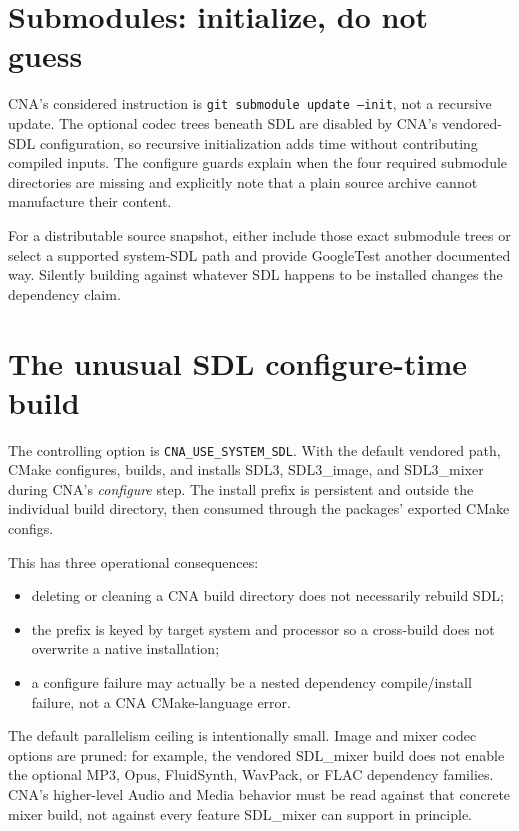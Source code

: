 \section{Submodules: initialize, do not guess}

CNA's considered instruction is \texttt{git submodule update --init}, not a recursive update.
The optional codec trees beneath SDL are disabled by CNA's vendored-SDL configuration, so recursive
initialization adds time without contributing compiled inputs.  The configure guards explain when
the four required submodule directories are missing and explicitly note that a plain source archive
cannot manufacture their content.

For a distributable source snapshot, either include those exact submodule trees or select a
supported system-SDL path and provide GoogleTest another documented way.  Silently building against
whatever SDL happens to be installed changes the dependency claim.

\section{The unusual SDL configure-time build}

The controlling option is \texttt{CNA\_USE\_SYSTEM\_SDL}.  With the default vendored path, CMake
configures, builds, and installs SDL3, SDL3\_image, and SDL3\_mixer during CNA's
\emph{configure} step.  The install prefix is persistent
and outside the individual build directory, then consumed through the packages' exported CMake
configs.

This has three operational consequences:

\begin{itemize}
  \item deleting or cleaning a CNA build directory does not necessarily rebuild SDL;
  \item the prefix is keyed by target system and processor so a cross-build does not overwrite a
        native installation;
  \item a configure failure may actually be a nested dependency compile/install failure, not a
        CNA CMake-language error.
\end{itemize}

The default parallelism ceiling is intentionally small.  Image and mixer codec options are pruned:
for example, the vendored SDL\_mixer build does not enable the optional MP3, Opus, FluidSynth,
WavPack, or FLAC dependency families.  CNA's higher-level Audio and Media behavior must be read
against that concrete mixer build, not against every feature SDL\_mixer can support in principle.

